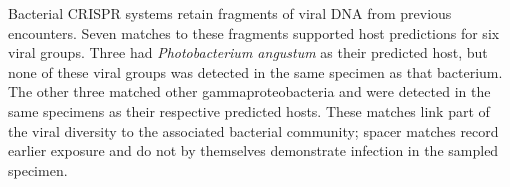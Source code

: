 Bacterial CRISPR systems retain fragments of viral DNA from previous
encounters. Seven matches to these fragments supported host predictions
for six viral groups. Three had \textit{Photobacterium angustum} as their
predicted host, but none of these viral groups was detected in the same
specimen as that bacterium. The other three matched other
gammaproteobacteria and were detected in the same specimens as their
respective predicted hosts. These matches link part of the viral diversity
to the associated bacterial community; spacer matches record earlier
exposure and do not by themselves demonstrate infection in the sampled specimen.
